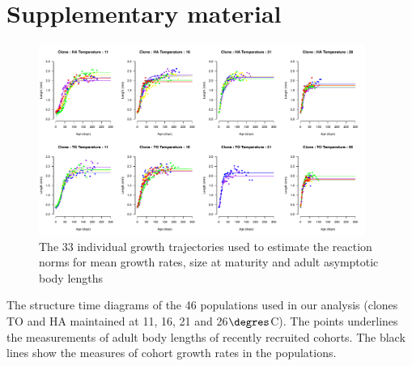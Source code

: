 \newpage
\section{Supplementary material}

\begin{figure}[!ht] %
\centering
\includegraphics[width=0.95\textwidth]{5_ChapExp3/fig/FigS1}
\caption[Individual growth trajectories]{
The 33 individual growth trajectories used to estimate the reaction norms for mean growth rates, size at maturity and adult asymptotic body lengths}
\label{Fig5-S1}
\end{figure}



 The structure time diagrams of the 46 populations used in our analysis (clones
  TO and HA maintained at 11, 16, 21 and 26$\degres$C). The points underlines the
  measurements of adult body lengths of recently recruited cohorts. The black
  lines show the measures of cohort growth rates in the populations.
  


